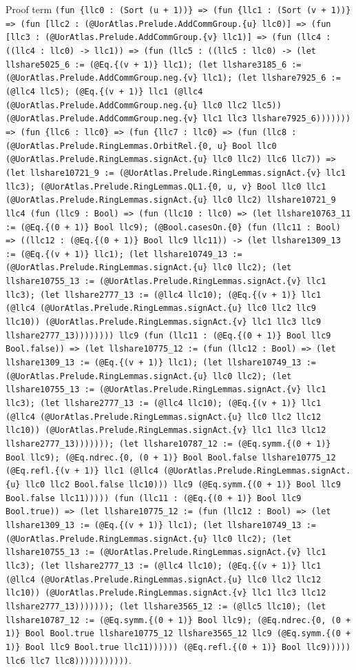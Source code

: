 \documentclass[11pt]{article}
\begin{document}
\noindent Proof term \texttt{(fun \{llc0 : (Sort (u + 1))\} => (fun \{llc1 : (Sort (v + 1))\} => (fun [llc2 : (@UorAtlas.Prelude.AddCommGroup.\{u\} llc0)] => (fun [llc3 : (@UorAtlas.Prelude.AddCommGroup.\{v\} llc1)] => (fun (llc4 : ((llc4 : llc0) -> llc1)) => (fun (llc5 : ((llc5 : llc0) -> (let llshare5025\_6 := (@Eq.\{(v + 1)\} llc1); (let llshare3185\_6 := (@UorAtlas.Prelude.AddCommGroup.neg.\{v\} llc1); (let llshare7925\_6 := (@llc4 llc5); (@Eq.\{(v + 1)\} llc1 (@llc4 (@UorAtlas.Prelude.AddCommGroup.neg.\{u\} llc0 llc2 llc5)) (@UorAtlas.Prelude.AddCommGroup.neg.\{v\} llc1 llc3 llshare7925\_6))))))) => (fun \{llc6 : llc0\} => (fun \{llc7 : llc0\} => (fun (llc8 : (@UorAtlas.Prelude.RingLemmas.OrbitRel.\{0, u\} Bool llc0 (@UorAtlas.Prelude.RingLemmas.signAct.\{u\} llc0 llc2) llc6 llc7)) => (let llshare10721\_9 := (@UorAtlas.Prelude.RingLemmas.signAct.\{v\} llc1 llc3); (@UorAtlas.Prelude.RingLemmas.QL1.\{0, u, v\} Bool llc0 llc1 (@UorAtlas.Prelude.RingLemmas.signAct.\{u\} llc0 llc2) llshare10721\_9 llc4 (fun (llc9 : Bool) => (fun (llc10 : llc0) => (let llshare10763\_11 := (@Eq.\{(0 + 1)\} Bool llc9); (@Bool.casesOn.\{0\} (fun (llc11 : Bool) => ((llc12 : (@Eq.\{(0 + 1)\} Bool llc9 llc11)) -> (let llshare1309\_13 := (@Eq.\{(v + 1)\} llc1); (let llshare10749\_13 := (@UorAtlas.Prelude.RingLemmas.signAct.\{u\} llc0 llc2); (let llshare10755\_13 := (@UorAtlas.Prelude.RingLemmas.signAct.\{v\} llc1 llc3); (let llshare2777\_13 := (@llc4 llc10); (@Eq.\{(v + 1)\} llc1 (@llc4 (@UorAtlas.Prelude.RingLemmas.signAct.\{u\} llc0 llc2 llc9 llc10)) (@UorAtlas.Prelude.RingLemmas.signAct.\{v\} llc1 llc3 llc9 llshare2777\_13)))))))) llc9 (fun (llc11 : (@Eq.\{(0 + 1)\} Bool llc9 Bool.false)) => (let llshare10775\_12 := (fun (llc12 : Bool) => (let llshare1309\_13 := (@Eq.\{(v + 1)\} llc1); (let llshare10749\_13 := (@UorAtlas.Prelude.RingLemmas.signAct.\{u\} llc0 llc2); (let llshare10755\_13 := (@UorAtlas.Prelude.RingLemmas.signAct.\{v\} llc1 llc3); (let llshare2777\_13 := (@llc4 llc10); (@Eq.\{(v + 1)\} llc1 (@llc4 (@UorAtlas.Prelude.RingLemmas.signAct.\{u\} llc0 llc2 llc12 llc10)) (@UorAtlas.Prelude.RingLemmas.signAct.\{v\} llc1 llc3 llc12 llshare2777\_13))))))); (let llshare10787\_12 := (@Eq.symm.\{(0 + 1)\} Bool llc9); (@Eq.ndrec.\{0, (0 + 1)\} Bool Bool.false llshare10775\_12 (@Eq.refl.\{(v + 1)\} llc1 (@llc4 (@UorAtlas.Prelude.RingLemmas.signAct.\{u\} llc0 llc2 Bool.false llc10))) llc9 (@Eq.symm.\{(0 + 1)\} Bool llc9 Bool.false llc11))))) (fun (llc11 : (@Eq.\{(0 + 1)\} Bool llc9 Bool.true)) => (let llshare10775\_12 := (fun (llc12 : Bool) => (let llshare1309\_13 := (@Eq.\{(v + 1)\} llc1); (let llshare10749\_13 := (@UorAtlas.Prelude.RingLemmas.signAct.\{u\} llc0 llc2); (let llshare10755\_13 := (@UorAtlas.Prelude.RingLemmas.signAct.\{v\} llc1 llc3); (let llshare2777\_13 := (@llc4 llc10); (@Eq.\{(v + 1)\} llc1 (@llc4 (@UorAtlas.Prelude.RingLemmas.signAct.\{u\} llc0 llc2 llc12 llc10)) (@UorAtlas.Prelude.RingLemmas.signAct.\{v\} llc1 llc3 llc12 llshare2777\_13))))))); (let llshare3565\_12 := (@llc5 llc10); (let llshare10787\_12 := (@Eq.symm.\{(0 + 1)\} Bool llc9); (@Eq.ndrec.\{0, (0 + 1)\} Bool Bool.true llshare10775\_12 llshare3565\_12 llc9 (@Eq.symm.\{(0 + 1)\} Bool llc9 Bool.true llc11)))))) (@Eq.refl.\{(0 + 1)\} Bool llc9))))) llc6 llc7 llc8)))))))))))}.\par
\end{document}
